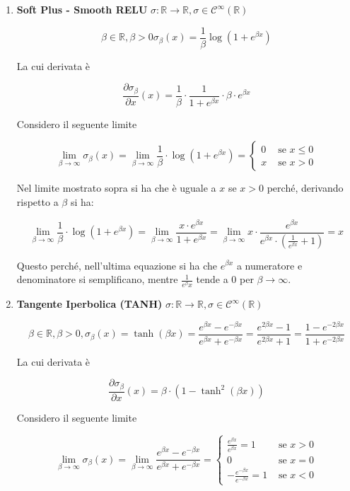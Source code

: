 \documentclass[a4paper,12pt]{article}
\begin{document}
\begin{enumerate}
		\item \textbf{Soft Plus - Smooth RELU} $\sigma : \mathbb{R} \rightarrow \mathbb{R}, \sigma \in \mathcal{C}^\infty(\mathbb{R})$

		\[
		\beta \in \mathbb{R}, \beta > 0 \sigma_\beta(x) = \frac{1}{\beta} \log(1 + e^{\beta x})
		\]

		La cui derivata è

		\[
		\frac{\partial \sigma_\beta}{\partial x} (x) = \frac{1}{\beta} \cdot \frac{1}{1 + e^{\beta x}} \cdot \beta \cdot e^{\beta x}
		\]

		Considero il seguente limite

		\[
		\lim_{\beta \rightarrow \infty} \sigma_\beta(x) = \lim_{\beta \rightarrow \infty}  \frac{1}{\beta} \cdot \log(1 + e^{\beta x}) = \begin{cases}
			0 & \text{ se } x \leq 0 \\
			x & \text{ se } x > 0
		\end{cases}
		\]

		Nel limite mostrato sopra si ha che è uguale a $x$ se $x > 0$ perché, derivando rispetto a $\beta$ si ha:

		\[
		\lim_{\beta \rightarrow \infty}  \frac{1}{\beta} \cdot \log(1 + e^{\beta x}) = \lim_{\beta \rightarrow \infty} \frac{x \cdot e^{\beta x}}{ 1 + e^{\beta x}} = \lim_{\beta \rightarrow \infty} x \cdot \frac{e^{\beta x}}{e^{\beta x} \cdot (\frac{1}{e^{\beta x}} + 1)} = x
		\]

		Questo perché, nell'ultima equazione si ha che $e^{\beta x}$ a numeratore e denominatore si semplificano, mentre $\frac{1}{e^{\beta} x}$ tende a 0 per $\beta \rightarrow \infty$.

		\item \textbf{Tangente Iperbolica (TANH)} $\sigma : \mathbb{R} \rightarrow \mathbb{R}, \sigma \in \mathcal{C}^\infty(\mathbb{R})$

		\[
		\beta \in \mathbb{R}, \beta > 0, \sigma_\beta(x) = \tanh(\beta x) = \frac{e^{\beta x} - e^{- \beta x}}{e^{\beta x} + e^{- \beta x}} = \frac{e^{2\beta x} - 1}{e^{2\beta x} + 1} = \frac{1 - e^{-2 \beta x}}{1 + e^{-2 \beta x}}
		\]

		La cui derivata è

		\[
		\frac{\partial \sigma_\beta}{\partial x}(x) = \beta \cdot (1 - \tanh^2(\beta x))
		\]

		Considero il seguente limite

		\[
		\lim_{\beta \rightarrow \infty} \sigma_\beta (x) = \lim_{\beta \rightarrow \infty} \frac{e^{\beta x} - e^{- \beta x}}{e^{\beta x} + e^{- \beta x}} = \begin{cases}
			\frac{e^{\beta x}}{e^{\beta x}} = 1 & \text{ se } x > 0 \\
			0 & \text{ se } x = 0 \\
			-\frac{e^{- \beta x}}{e^{- \beta x}} = 1 & \text{ se } x < 0
		\end{cases}
		\]
	\end{enumerate}
\end{document}
